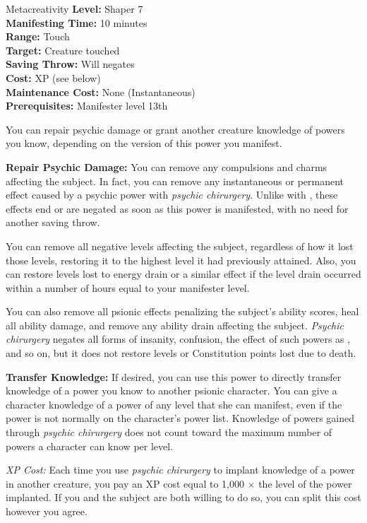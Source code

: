 {Metacreativity}
{
	\textbf{Level:}
	Shaper 7\\
	\textbf{Manifesting Time:}
	10 minutes\\
	\textbf{Range:}
	Touch\\
	\textbf{Target:}
	Creature touched\\
	\textbf{Saving Throw:}
	Will negates\\
	\textbf{Cost:}
	XP (see below)\\
	\textbf{Maintenance Cost:}
	None (Instantaneous)\\
	\textbf{Prerequisites:}
	Manifester level 13th\\
}
{
	You can repair psychic damage or grant another creature knowledge of powers you know, depending on the version of this power you manifest.

	\textbf{Repair Psychic Damage:} You can remove any compulsions and charms affecting the subject. In fact, you can remove any instantaneous or permanent effect caused by a psychic power with \emph{psychic chirurgery}. Unlike with , these effects end or are negated as soon as this power is manifested, with no need for another saving throw.

	You can remove all negative levels affecting the subject, regardless of how it lost those levels, restoring it to the highest level it had previously attained. Also, you can restore levels lost to energy drain or a similar effect if the level drain occurred within a number of hours equal to your manifester level.

	You can also remove all psionic effects penalizing the subject's ability scores, heal all ability damage, and remove any ability drain affecting the subject. \emph{Psychic chirurgery} negates all forms of insanity, confusion, the effect of such powers as , and so on, but it does not restore levels or Constitution points lost due to death.

	\textbf{Transfer Knowledge:} If desired, you can use this power to directly transfer knowledge of a power you know to another psionic character. You can give a character knowledge of a power of any level that she can manifest, even if the power is not normally on the character's power list. Knowledge of powers gained through \emph{psychic chirurgery} does not count toward the maximum number of powers a character can know per level.

	\textit{XP Cost:} Each time you use \emph{psychic chirurgery} to implant knowledge of a power in another creature, you pay an XP cost equal to 1,000 $\times$ the level of the power implanted. If you and the subject are both willing to do so, you can split this cost however you agree.
}